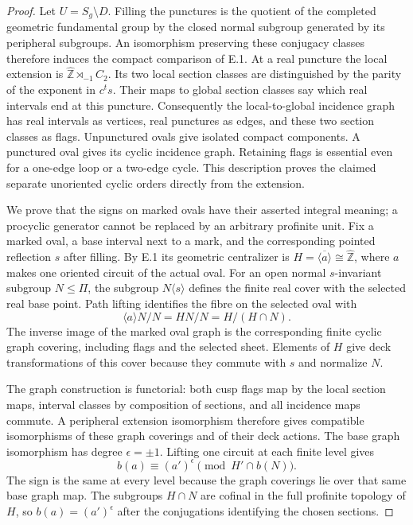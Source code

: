\begin{proof}
Let $U=S_g\setminus D$.  Filling the punctures is the quotient
of the completed geometric fundamental group by the closed
normal subgroup generated by its peripheral subgroups.  An
isomorphism preserving these conjugacy classes therefore induces
the compact comparison of E.1.  At a real puncture the local
extension is $\widehat{\mathbb Z}\rtimes_{-1}C_2$.  Its two
local section classes are distinguished by the parity of the
exponent in $c^t s$.  Their maps to global section classes say
which real intervals end at this puncture.  Consequently the
local-to-global incidence graph has real intervals as vertices,
real punctures as edges, and these two section classes as flags.
Unpunctured ovals give isolated compact components.  A punctured
oval gives its cyclic incidence graph.  Retaining flags is
essential even for a one-edge loop or a two-edge cycle.  This
description proves the claimed separate unoriented cyclic
orders directly from the extension.

We prove that the signs on marked ovals have their asserted
integral meaning; a procyclic generator cannot be replaced by
an arbitrary profinite unit.  Fix a marked oval, a base interval
next to a mark, and the corresponding pointed reflection $s$
after filling.  By E.1 its geometric centralizer is
$H=\overline{\langle a\rangle}\cong\widehat{\mathbb Z}$,
where $a$ makes one oriented circuit of the actual oval.
For an open normal $s$-invariant subgroup $N\leq\Pi$, the
subgroup $N\langle s\rangle$ defines the finite real cover with
the selected real base point.  Path lifting identifies the
fibre on the selected oval with
\[
 \langle a\rangle N/N=HN/N=H/(H\cap N).                    \tag{E.2.1}
\]
The inverse image of the marked oval graph is the corresponding
finite cyclic graph covering, including flags and the selected
sheet.  Elements of $H$ give deck transformations of this
cover because they commute with $s$ and normalize $N$.

The graph construction is functorial: both cusp flags map by
the local section maps, interval classes by composition of
sections, and all incidence maps commute.  A peripheral
extension isomorphism therefore gives compatible isomorphisms
of these graph coverings and of their deck actions.  The base
graph isomorphism has degree $\epsilon=\pm1$.  Lifting one
circuit at each finite level gives
\[
 b(a)\equiv(a')^\epsilon\pmod{H'\cap b(N)}.
\]
The sign is the same at every level because the graph coverings
lie over that same base graph map.  The subgroups $H\cap N$
are cofinal in the full profinite topology of $H$, so
$b(a)=(a')^\epsilon$ after the conjugations identifying the
chosen sections.


\end{proof}
